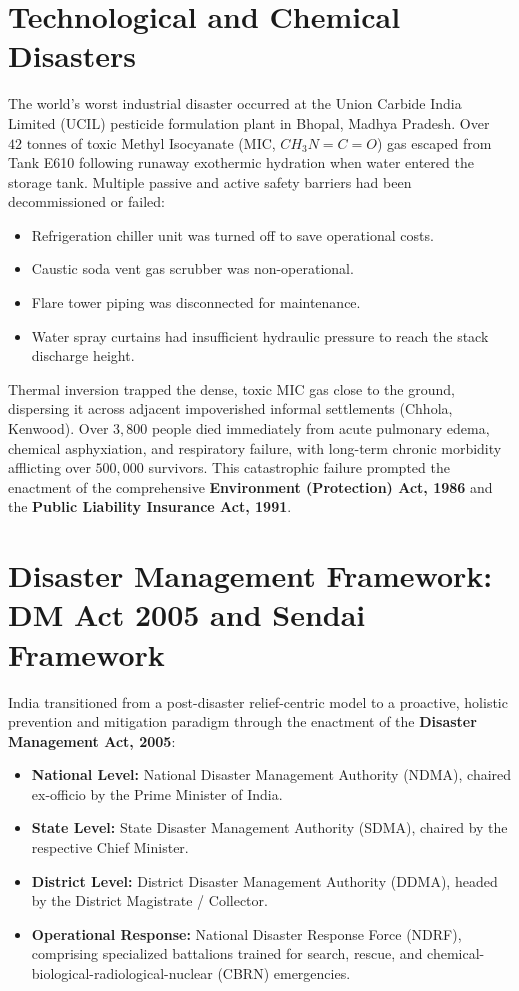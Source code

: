 \section{Technological and Chemical Disasters}
\begin{casestudy}
The world's worst industrial disaster occurred at the Union Carbide India Limited (UCIL) pesticide formulation plant in Bhopal, Madhya Pradesh. Over $42\text{ tonnes}$ of toxic Methyl Isocyanate (MIC, $CH_3N=C=O$) gas escaped from Tank E610 following runaway exothermic hydration when water entered the storage tank. Multiple passive and active safety barriers had been decommissioned or failed:
\begin{itemize}[leftmargin=1.2em]
    \item Refrigeration chiller unit was turned off to save operational costs.
    \item Caustic soda vent gas scrubber was non-operational.
    \item Flare tower piping was disconnected for maintenance.
    \item Water spray curtains had insufficient hydraulic pressure to reach the stack discharge height.
\end{itemize}
Thermal inversion trapped the dense, toxic MIC gas close to the ground, dispersing it across adjacent impoverished informal settlements (Chhola, Kenwood). Over $3{,}800$ people died immediately from acute pulmonary edema, chemical asphyxiation, and respiratory failure, with long-term chronic morbidity afflicting over $500{,}000$ survivors. This catastrophic failure prompted the enactment of the comprehensive \textbf{Environment (Protection) Act, 1986} and the \textbf{Public Liability Insurance Act, 1991}.
\end{casestudy}

\section{Disaster Management Framework: DM Act 2005 and Sendai Framework}
India transitioned from a post-disaster relief-centric model to a proactive, holistic prevention and mitigation paradigm through the enactment of the \textbf{Disaster Management Act, 2005}:
\begin{itemize}[leftmargin=1.5em]
    \item \textbf{National Level:} National Disaster Management Authority (NDMA), chaired ex-officio by the Prime Minister of India.
    \item \textbf{State Level:} State Disaster Management Authority (SDMA), chaired by the respective Chief Minister.
    \item \textbf{District Level:} District Disaster Management Authority (DDMA), headed by the District Magistrate / Collector.
    \item \textbf{Operational Response:} National Disaster Response Force (NDRF), comprising specialized battalions trained for search, rescue, and chemical-biological-radiological-nuclear (CBRN) emergencies.
\end{itemize}

